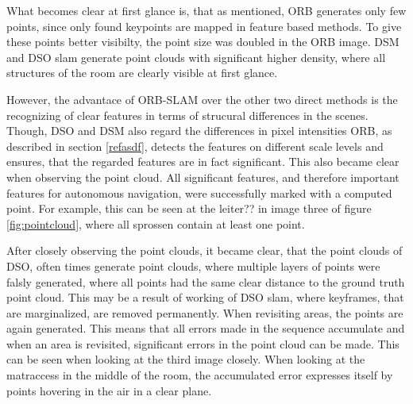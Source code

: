 What becomes clear at first glance is, that as mentioned, ORB generates only few points, since only found keypoints are mapped in feature based methods.
 To give these  points better visibilty, the point size was doubled in the ORB image. DSM and DSO slam generate point clouds with significant higher 
 density, where all structures of the room are clearly visible at first glance. 
 
 However, the advantace of ORB-SLAM over the other two direct methods 
 is the recognizing of clear features in terms of strucural differences in the scenes. Though, DSO and DSM also regard the differences in pixel intensities
 ORB, as described in section \ref{refasdf}, detects the features on different scale levels and ensures, that the regarded features are in fact significant. 
 This also became clear when observing the point cloud. All significant features, and therefore important features for autonomous navigation, were successfully 
 marked with a computed point. For example, this can be seen at the leiter?? in image three of figure \ref{fig:pointcloud}, where all sprossen contain at least 
 one point. 
 
 After closely observing the point clouds, it became clear, that the point clouds of DSO, often times generate point clouds, where multiple layers of 
 points were falsly generated, where all points had the same clear distance to the ground truth point cloud. This may be a result of working of DSO slam, 
 where keyframes, that are marginalized, are removed permanently. When revisiting areas, the points are again generated. This means that all errors made
 in the sequence accumulate and when an area is revisited, significant errors in the point cloud can be made. This can be seen when looking at the 
 third image closely. When looking at the matraccess in the middle of the room, the accumulated error expresses itself by points hovering in the air 
 in a clear plane. 
 
 

